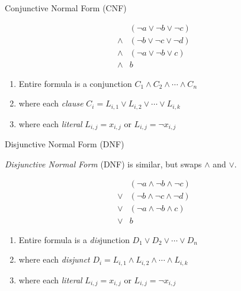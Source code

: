 \documentclass[xetex,aspectratio=169,14pt,hyperref={pdfpagelabels=true,pdflang={en-GB}}]{beamer}
\begin{document}
\frame{\titlepage}





\begin{frame}[t]
  {Conjunctive Normal Form (CNF)}

  \begin{displaymath}
    \begin{array}{cl}
      &(\lnot a \lor \lnot b \lor \lnot c) \\
      \land&(\lnot b \lor \lnot c \lor \lnot d) \\
      \land&(\lnot a \lor \lnot b \lor c) \\
      \land&b
    \end{array}
  \end{displaymath}
  \begin{enumerate}
  \item Entire formula is a conjunction $C_1 \land C_2 \land \cdots \land C_n$
  \item where each \emph{clause} $C_i = L_{i,1} \lor L_{i,2} \lor \cdots \lor L_{i,k}$
  \item where each \emph{literal} $L_{i,j} = x_{i,j}$ or $L_{i,j} = \lnot x_{i,j}$
  \end{enumerate}
\end{frame}

\begin{frame}[t]
  {Disjunctive Normal Form (DNF)}

  \emph{Disjunctive Normal Form} (DNF) is similar, but swaps $\land$
  and $\lor$.

  \begin{displaymath}
    \begin{array}{cl}
      &(\lnot a \land \lnot b \land \lnot c) \\
      \lor&(\lnot b \land \lnot c \land \lnot d) \\
      \lor&(\lnot a \land \lnot b \land c) \\
      \lor&b
    \end{array}
  \end{displaymath}
  \begin{enumerate}
  \item Entire formula is a \emph{dis}junction $D_1 \lor D_2 \lor \cdots \lor D_n$
  \item where each \emph{disjunct} $D_i = L_{i,1} \land L_{i,2} \land \cdots \land L_{i,k}$
  \item where each \emph{literal} $L_{i,j} = x_{i,j}$ or $L_{i,j} = \lnot x_{i,j}$
  \end{enumerate}
\end{frame}
\end{document}
